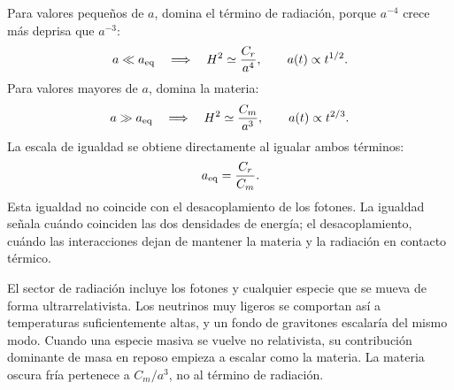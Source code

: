 Para valores pequeños de \(a\), domina el término de radiación, porque \(a^{-4}\) crece más deprisa que \(a^{-3}\):
\begin{equation}
a\ll a_{\rm eq}
\quad\Longrightarrow\quad
H^2\simeq\frac{C_r}{a^4},
\qquad
a(t)\propto t^{1/2}.
\end{equation}
Para valores mayores de \(a\), domina la materia:
\begin{equation}
a\gg a_{\rm eq}
\quad\Longrightarrow\quad
H^2\simeq\frac{C_m}{a^3},
\qquad
a(t)\propto t^{2/3}.
\end{equation}
La escala de igualdad se obtiene directamente al igualar ambos términos:
\begin{equation}
a_{\rm eq}=\frac{C_r}{C_m}.
\label{eq:c02-equality-scale}
\end{equation}
Esta igualdad no coincide con el desacoplamiento de los fotones. La igualdad señala cuándo coinciden las dos densidades de energía; el desacoplamiento, cuándo las interacciones dejan de mantener la materia y la radiación en contacto térmico.

El sector de radiación incluye los fotones y cualquier especie que se mueva de forma ultrarrelativista. Los neutrinos muy ligeros se comportan así a temperaturas suficientemente altas, y un fondo de gravitones escalaría del mismo modo. Cuando una especie masiva se vuelve no relativista, su contribución dominante de masa en reposo empieza a escalar como la materia. La materia oscura fría pertenece a \(C_m/a^3\), no al término de radiación.

\begin{classroomqa}
\end{classroomqa}

\begin{classroomqa}
\end{classroomqa}

